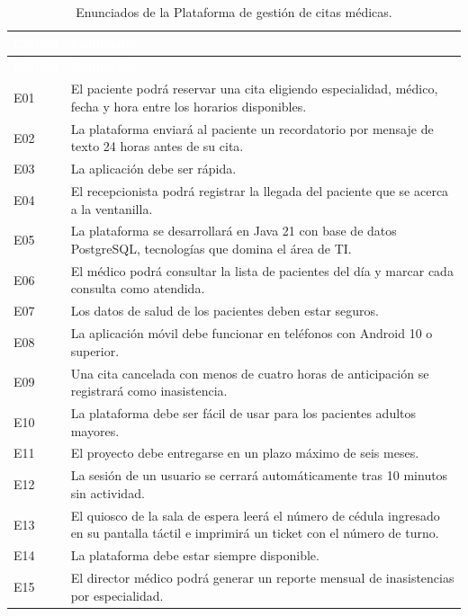 \documentclass[11pt]{article}
\newcommand{\thdr}[1]{\cellcolor{utegreen}\textcolor{white}{\textbf{#1}}}
\begin{document}
{\small
\begin{longtable}{|>{\centering\arraybackslash}p{1.5cm}|p{\dimexpr\textwidth-1.5cm-4\tabcolsep-3\arrayrulewidth\relax}|}
	\caption{Enunciados de la Plataforma de gestión de citas médicas.}\label{tab:enunciados}\\
	\hline
	\thdr{Código} & \thdr{Enunciado} \\
	\hline
	\endfirsthead
	\hline
	\thdr{Código} & \thdr{Enunciado} \\
	\hline
	\endhead
	E01 & El paciente podrá reservar una cita eligiendo especialidad, médico, fecha y hora entre los horarios disponibles. \\ \hline
	E02 & La plataforma enviará al paciente un recordatorio por mensaje de texto 24 horas antes de su cita. \\ \hline
	E03 & La aplicación debe ser rápida. \\ \hline
	E04 & El recepcionista podrá registrar la llegada del paciente que se acerca a la ventanilla. \\ \hline
	E05 & La plataforma se desarrollará en Java 21 con base de datos PostgreSQL, tecnologías que domina el área de TI. \\ \hline
	E06 & El médico podrá consultar la lista de pacientes del día y marcar cada consulta como atendida. \\ \hline
	E07 & Los datos de salud de los pacientes deben estar seguros. \\ \hline
	E08 & La aplicación móvil debe funcionar en teléfonos con Android 10 o superior. \\ \hline
	E09 & Una cita cancelada con menos de cuatro horas de anticipación se registrará como inasistencia. \\ \hline
	E10 & La plataforma debe ser fácil de usar para los pacientes adultos mayores. \\ \hline
	E11 & El proyecto debe entregarse en un plazo máximo de seis meses. \\ \hline
	E12 & La sesión de un usuario se cerrará automáticamente tras 10 minutos sin actividad. \\ \hline
	E13 & El quiosco de la sala de espera leerá el número de cédula ingresado en su pantalla táctil e imprimirá un ticket con el número de turno. \\ \hline
	E14 & La plataforma debe estar siempre disponible. \\ \hline
	E15 & El director médico podrá generar un reporte mensual de inasistencias por especialidad. \\ \hline

\end{longtable}}
\end{document}
